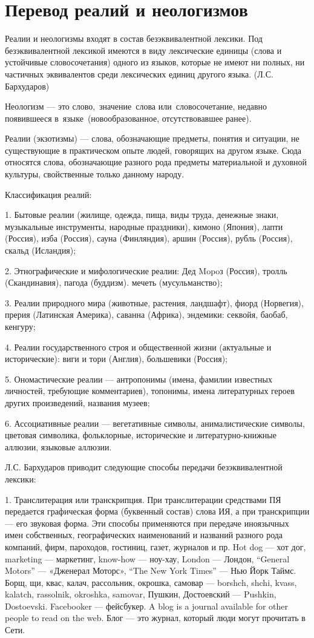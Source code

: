 \section{Перевод реалий и неологизмов}

Реалии и неологизмы входят в состав безэквивалентной лексики. Под безэквивалентной лексикой имеются в виду лексические единицы (слова и устойчивые словосочетания) одного из языков, которые не имеют ни полных, ни частичных эквивалентов среди лексических единиц другого языка. (Л.С. Бархударов)

Неологизм  --- это слово, значение слова или словосочетание, недавно появившееся в языке (новообразованное, отсутствовавшее ранее).

Реалии (экзотизмы) --- слова, обозначающие предметы, понятия и ситуации, не существующие в практическом опыте людей, говорящих на другом языке. Сюда относятся слова, обозначающие разного рода предметы материальной и духовной культуры, свойственные только данному народу. 

Классификация реалий:

1. Бытовые реалии (жилище, одежда, пища, виды труда, денежные знаки, музыкальные инструменты, народные праздники), кимоно (Япония), лапти (Россия), изба (Россия), сауна (Финляндия), аршин (Россия), рубль (Россия), скальд (Исландия);

2. Этнографические и мифологические реалии: Дед Mopoз (Россия), тролль (Скандинавия), пагода (буддизм). мечеть (мусульманство);

3. Реалии природного мира (животные, растения, ландшафт), фиорд (Норвегия), прерия (Латинская Америка), саванна (Африка), эндемики: секвойя, баобаб, кенгуру;

4. Реалии государственного строя и общественной жизни (актуальные и исторические): виги и тори (Англия), большевики (Россия);

5. Ономастические реалии --- антропонимы (имена, фамилии известных личностей, требующие комментариев), топонимы, имена литературных героев других произведений, названия музеев;

6. Ассоциативные реалии --- вегетативные символы, анималистические символы, цветовая символика, фольклорные, исторические и литературно-книжные аллюзии, языковые аллюзии.

Л.С. Бархударов приводит следующие способы передачи безэквивалентной лексики:

1. Транслитерация или транскрипция. При транслитерации средствами ПЯ передается графическая форма (буквенный состав) слова ИЯ, а при транскрипции --- его звуковая форма. Эти способы применяются при передаче иноязычных имен собственных, географических наименований и названий разного рода компаний, фирм, пароходов, гостиниц, газет, журналов и пр. Hot dog --- хот дог, marketing --- маркетинг, know-how --- ноу-хау, London --- Лондон, “General Motors” --- «Дженерал Моторс», “The New York Times” --- Нью Йорк Таймс. Борщ, щи, квас, калач, рассольник, окрошка, самовар --- borshch, shchi, kvass, kalatch, rassolnik, okroshka, samovar, Пушкин, Достоевский --- Pushkin, Dostoevski. Facebooker --- фейсбукер. A blog is a journal available for other people to read on the web. Блог --- это журнал, который люди могут прочитать в Сети. 

